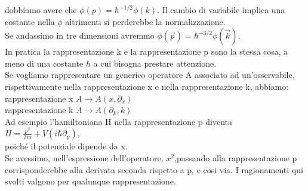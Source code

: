 \begin{flushleft}
dobbiamo avere che $\phi\left(p\right)=\hbar^{-1/2}\phi\left(k\right)$. Il cambio di variabile implica una costante nella $\phi$ altrimenti si perderebbe la normalizzazione.\\
Se andassimo in tre dimensioni avremmo $\phi\left(\vec{p}\right)=\hbar^{-3/2}\phi\left(\vec{k}\right)$.\\
In pratica la rappresentazione k e la rappresentazione p sono la stessa cosa, a meno di una costante $\hbar$ a cui bisogna prestare attenzione.\\
Se vogliamo rappresentare un generico operatore A associato ad un'osservabile, rispettivamente nella rappresentazione x e nella rappresentazione k, abbiamo:\\
rappresentazione x  $A\longrightarrow A\left(x,\partial_x\right)$\\ 
rappresentazione k  $A\longrightarrow A\left(\partial_k,k\right)$\\
Ad esempio l'hamiltoniana H nella rappresentazione p diventa $H=\frac{p^2}{2m}+V\left(i\hbar\partial_p\right)$,\\
poiché il potenziale dipende da x.\\ Se avessimo, nell'espressione dell'operatore, $x^2$,passando alla rappresentazione p corrisponderebbe alla derivata seconda rispetto a p, e cosi via.
I ragionamenti qui svolti valgono per qualunque rappresentazione.
\end{flushleft}
%

